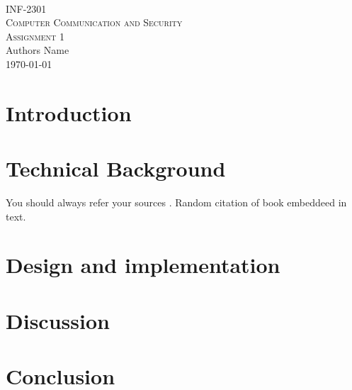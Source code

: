 


\def \courseCode {INF-2301}
\def \course {Computer Communication and Security}
\def \thetitle {Assignment 1}
\def \theauthor {Authors Name}
\def \pagecount {2}




\begin{center}
\textsc{\\[1.0cm]}
\textsc{\Large \courseCode\\ \course}\\[1.0cm]
\textsc{\LARGE \thetitle}\\[1.0cm]
\LARGE{\theauthor} \\
{\large \today}
\end{center}

\section{Introduction}

\section{Technical Background}

You should always refer your sources \cite{site}.
Random citation of book \cite{example} embeddeed in text.


\section{Design and implementation}

\section{Discussion}

\section{Conclusion}




